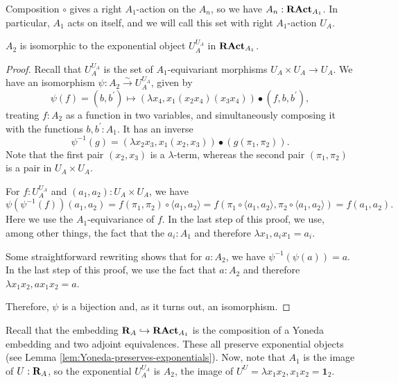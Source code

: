 \begin{definition}
  Composition $ \circ $ gives a right $ A_1 $-action on the $ A_n $, so we have $ A_n : \mathbf{RAct}_{A_1} $. In particular, $ A_1 $ acts on itself, and we will call this set with right $ A_1 $-action $ U_A $.
\end{definition}

\begin{lemma}
  $ A_2 $ is isomorphic to the exponential object $ U_A^{U_A} $ in $ \mathbf{RAct}_{A_1} $.
\end{lemma}
\begin{proof}
  Recall that $ U_A^{U_A} $ is the set of $ A_1 $-equivariant morphisms $ U_A \times U_A \to U_A $. We have an isomorphism $ \psi: A_2 \xrightarrow \sim U_A^{U_A} $, given by
  \[ \psi(f) = (b, b^\prime) \mapsto (\lambda x_4, x_1 (x_2 x_4) (x_3 x_4)) \bullet (f, b, b^\prime), \]
  treating $ f : A_2 $ as a function in two variables, and simultaneously composing it with the functions $ b, b^\prime : A_1 $. It has an inverse
  \[ \psi^{-1}(g) = (\lambda x_2 x_3, x_1 (x_2, x_3)) \bullet (g(\pi_1, \pi_2)). \]
  Note that the first pair $ (x_2, x_3) $ is a $ \lambda $-term, whereas the second pair $ (\pi_1, \pi_2) $ is a pair in $ U_A \times U_A $.

  For $ f: U_A^{U_A} $ and $ (a_1, a_2): U_A \times U_A $, we have
  \[
    \psi(\psi^{-1}(f))(a_1, a_2)
    = f(\pi_1, \pi_2) \circ \langle a_1, a_2 \rangle
    = f(\pi_1 \circ \langle a_1, a_2 \rangle, \pi_2 \circ \langle a_1, a_2 \rangle)
    = f(a_1, a_2).
  \]
  Here we use the $ A_1 $-equivariance of $ f $. In the last step of this proof, we use, among other things, the fact that the $ a_i : A_1 $ and therefore $ \lambda x_1, a_i x_1 = a_i $.

  Some straightforward rewriting shows that for $ a: A_2 $, we have $ \psi^{-1}(\psi(a)) = a $. In the last step of this proof, we use the fact that $ a : A_2 $ and therefore $ \lambda x_1 x_2, a x_1 x_2 = a $.

  Therefore, $ \psi $ is a bijection and, as it turns out, an isomorphism.
\end{proof}

\begin{remark}
  Recall that the embedding $ \mathbf{R}_A \hookrightarrow \mathbf{RAct}_{A_1} $ is the composition of a Yoneda embedding and two adjoint equivalences. These all preserve exponential objects (see Lemma \ref{lem:Yoneda-preserves-exponentials}). Now, note that $ A_1 $ is the image of $ U : \mathbf{R}_A $, so the exponential $ U_A^{U_A} $ is $ A_2 $, the image of $ U^U = \lambda x_1 x_2, x_1 x_2 = \mathbf 1_2 $.
\end{remark}

